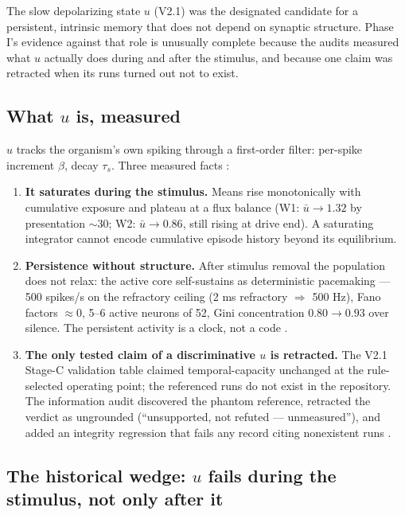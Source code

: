 The slow depolarizing state \(u\) (V2.1) was the designated candidate
for a persistent, intrinsic memory that does not depend on synaptic
structure. Phase I's evidence against that role is unusually complete
because the audits measured what \(u\) actually does during and after
the stimulus, and because one claim was retracted when its runs turned
out not to exist.

\subsection{What \(u\) is, measured}

\(u\) tracks the organism's own spiking through a first-order filter:
per-spike increment \(\beta\), decay \(\tau_s\). Three measured facts
\cite{infoaudit}:

\begin{enumerate}
\item \textbf{It saturates during the stimulus.} Means rise
monotonically with cumulative exposure and plateau at a flux balance
(W1: \(\bar u\to 1.32\) by presentation \(\sim\)30; W2:
\(\bar u\to 0.86\), still rising at drive end). A saturating integrator
cannot encode cumulative episode history beyond its equilibrium.
\item \textbf{Persistence without structure.} After stimulus removal
the population does not relax: the active core self-sustains as
deterministic pacemaking --- 500 spikes/s on the refractory ceiling
(2 ms refractory \(\Rightarrow\) 500 Hz), Fano factors \(\approx 0\),
5--6 active neurons of 52, Gini concentration \(0.80 \to 0.93\) over
silence. The persistent activity is a clock, not a code
\cite{infoaudit}.
\item \textbf{The only tested claim of a discriminative \(u\) is
retracted.} The V2.1 Stage-C validation table claimed temporal-capacity
unchanged at the rule-selected operating point; the referenced runs do
not exist in the repository. The information audit discovered the
phantom reference, retracted the verdict as ungrounded (``unsupported,
not refuted --- unmeasured''), and added an integrity regression that
fails any record citing nonexistent runs \cite{infoaudit}.
\end{enumerate}

\subsection{The historical wedge: \(u\) fails during the stimulus, not only after it}

